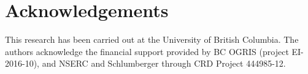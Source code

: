 \documentclass[review]{elsarticle}
\begin{document}
\section*{Acknowledgements}
This research has been carried out at the University of British Columbia. The authors acknowledge the financial support provided by BC OGRIS (project EI-2016-10), and NSERC and Schlumberger through CRD Project 444985-12.




\end{document}
